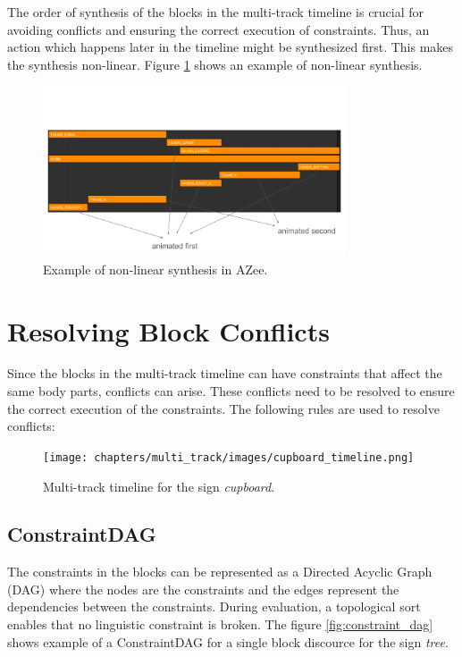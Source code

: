 \documentclass[../../main.tex]{subfiles}
\begin{document}
The order of synthesis of the blocks in the multi-track timeline is crucial for avoiding conflicts and ensuring the correct execution of constraints. Thus, an action which happens later in the timeline might be synthesized first. This makes the synthesis non-linear. Figure \ref{fig:example_azee_non_linear} shows an example of non-linear synthesis.

\begin{figure}[h]
    \centering
    \includegraphics[width=0.8\textwidth]{chapters/multi_track/images/example_azee_non_linear.png}
    \caption{Example of non-linear synthesis in AZee.}
    \label{fig:example_azee_non_linear}
\end{figure}

\section{Resolving Block Conflicts}
\label{ch:multi_track:resolve_conflitcs}

Since the blocks in the multi-track timeline can have constraints that affect the same body parts, conflicts can arise. These conflicts need to be resolved to ensure the correct execution of the constraints. The following rules are used to resolve conflicts:

\begin{figure}[h]
    \centering
    \texttt{[image: chapters/multi\_track/images/cupboard\_timeline.png]}
    \caption{Multi-track timeline for the sign \emph{cupboard}.}
    \label{fig:cupboard_timeline}
\end{figure}

\subsection{ConstraintDAG}
\label{ch:multi_track:resolve_conflitcs:constraint_dag}

The constraints in the blocks can be represented as a Directed Acyclic Graph (DAG) where the nodes are the constraints and the edges represent the dependencies between the constraints. During evaluation, a topological sort enables that no linguistic constraint is broken. The figure \ref{fig:constraint_dag} shows example of a ConstraintDAG for a single block discource for the sign \emph{tree}.
\end{document}
